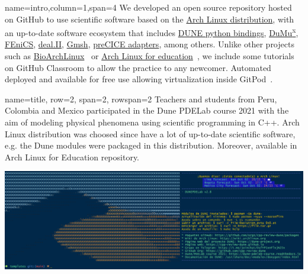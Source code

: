 \documentclass[
	paper=a0,
	style=ruled, %
	]{bfhsciposter}
\begin{document}
\begin{tcbposter}[
		poster={
				columns=4,
				rows=7,
				spacing=1cm,
			},]

	\begin{posterboxenv}[,BFH-abstract,title=Abstract]{name=intro,column=1,span=4}
		We developed an open source repository hosted on GitHub to use
		scientific software based on the \href{https://archlinux.org}{Arch Linux distribution},
		with an up-to-date software ecosystem that includes
		\href{https://dune-project.org/doc/gettingstarted}{DUNE python bindings},
		\href{https://dumux.org}{DuMu\textsuperscript{x}},
		\href{https://fenicsproject.org}{FEniCS},
		\href{https://www.dealii.org}{deal.II},
		\href{https://gmsh.info}{Gmsh},
		\href{https://precice.org/adapters-overview.html}{preCICE adapters},
		among others.
		Unlike other projects such as
		\href{https://github.com/BioArchLinux}{BioArchLinux}~\cite{bioarchlinux_2022}
		or \href{https://github.com/arch4edu}{Arch Linux for education}~\cite{arch4edu2022},
		we include some tutorials on GitHub Classroom to allow the practice
		to any newcomer.
		Automated deployed and available for free use allowing virtualization inside
		GitPod~\cite{gitpod_2022}.
	\end{posterboxenv}

	\begin{posterboxenv}[BFH-framed, title=C++ Review DUNE]{name=title, row=2, span=2, rowspan=2}
		Teachers and students from Peru, Colombia and Mexico participated in the Dune PDELab course 2021 with the aim of modeling physical phenomena using scientific programming in C++. Arch Linux distribution was choosed since have a lot of up-to-date scientific software, e.g. the Dune modules were packaged in this distribution. Moreover,  available in Arch Linux for Education repository.
		
		\includegraphics[width=\linewidth]{splash}
	\end{posterboxenv}


\end{tcbposter}
\end{document}

